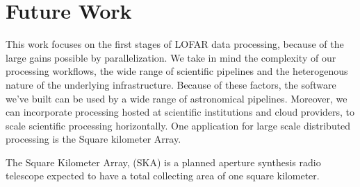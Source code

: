 \section{Future Work}

This work focuses on the first stages of LOFAR data processing, because of the large gains possible by parallelization. We take in mind the complexity of our processing workflows, the wide range of scientific pipelines and the heterogenous nature of the underlying infrastructure. Because of these factors, the software we've built can be used by a wide range of astronomical pipelines. Moreover, we can incorporate processing hosted at scientific institutions and cloud providers, to scale scientific processing horizontally.  One application for large scale distributed processing is the Square kilometer Array. 

The Square Kilometer Array, (SKA) is a planned aperture synthesis radio telescope expected to have a total collecting area of one square kilometer.   
